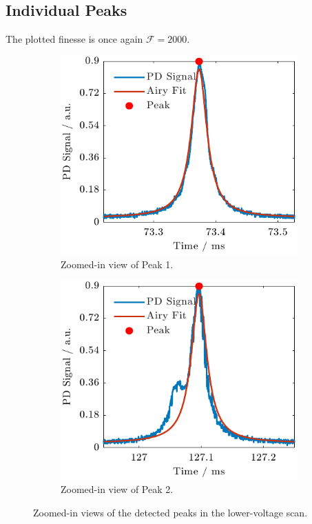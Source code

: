 \documentclass[a4paper,11pt]{article}
\begin{document}
\newpage
\subsection{Individual Peaks}
The plotted finesse is once again $\mathcal{F}=2000$.

\begin{figure}[H]
    \centering
    \begin{subfigure}[t]{0.48\textwidth}
        \centering
        \includegraphics[width=\textwidth]{Figure_3_low.pdf}
        \caption{Zoomed-in view of Peak 1.}
        \label{fig:peak1_low}
    \end{subfigure}
    \hfill
    \begin{subfigure}[t]{0.48\textwidth}
        \centering
        \includegraphics[width=\textwidth]{Figure_4_low.pdf}
        \caption{Zoomed-in view of Peak 2.}
        \label{fig:peak2_low}
    \end{subfigure}
    \caption{Zoomed-in views of the detected peaks in the lower-voltage scan.}
\end{figure}
\end{document}
